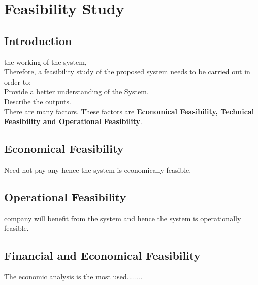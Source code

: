 \chapter{Feasibility Study}


\section{Introduction}
the working of the system, \\
Therefore, a feasibility study of the proposed system needs to be carried out in order to:\\
\textbullet \hspace{0.2cm} 	Provide a better understanding of the System.\\
\textbullet \hspace{0.2cm}	Describe the outputs.\\

There are many factors. These factors are \textbf{Economical Feasibility, Technical Feasibility and Operational Feasibility}.\\



\section{Economical Feasibility}
Need not pay any hence the system is economically feasible.\\

\section{Operational Feasibility}
company will benefit from the system and hence the system is operationally feasible. \\
\section{Financial and Economical Feasibility}
The economic analysis is the most used........
